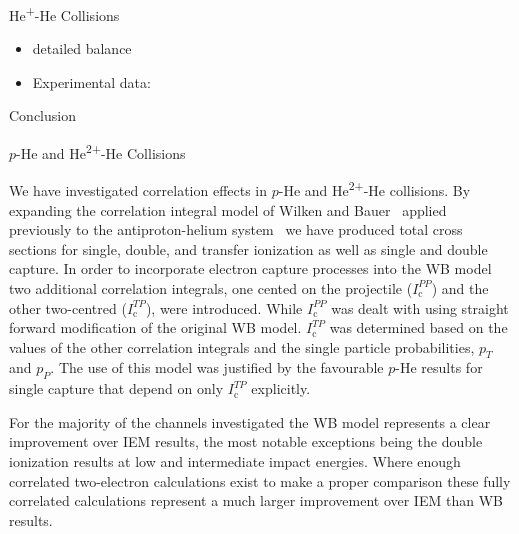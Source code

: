 \documentclass[letterpaper, 11 pt]{report}
\begin{document}
\begin{chapter}{\texorpdfstring{He\textsuperscript{+}}{He+}-He Collisions \label{chap:hep-he}}

   \begin{itemize}
      
      \item detailed balance~\cite[p. 143--152]{scattering}

      \item Experimental data:~\cite{DT-88, Dub-89, FTFHLP-95, SSMSM-11}

   \end{itemize}

\end{chapter}

\begin{chapter}{Conclusion \label{chap:con}}

   \begin{section}{\texorpdfstring{$p$}{p}-He and \texorpdfstring{He\textsuperscript{2+}}{He2+}-He
                   Collisions \label{sec:con-phe2p-he}}

      We have investigated correlation effects in $p$-He and He\textsuperscript{2+}-He collisions. By
      expanding the correlation integral model of Wilken and Bauer~\cite{wb} applied previously to the
      antiproton-helium system~\cite{pbarhe} we have produced total cross sections for single, double,
      and transfer ionization as well as single and double capture. In order to incorporate electron
      capture processes into the WB model two additional correlation integrals, one cented on the
      projectile ($I^{PP}_\mathrm{c}$) and the other two-centred ($I^{TP}_\mathrm{c}$), were
      introduced. While $I^{PP}_\mathrm{c}$ was dealt with using straight forward modification of the
      original WB model. $I^{TP}_\mathrm{c}$ was determined based on the values of the other correlation
      integrals and the single particle probabilities, $p_T$ and $p_P$. The use of this model was
      justified by the favourable $p$-He results for single capture that depend on only
      $I^{TP}_\mathrm{c}$ explicitly.

      For the majority of the channels investigated the WB model represents a clear improvement over IEM 
      results, the most notable exceptions being the double ionization results at low and intermediate
      impact energies. Where enough correlated two-electron calculations exist to make a proper
      comparison these fully correlated calculations represent a much larger improvement over IEM than
      WB results. 
  

\end{section}
\end{chapter}
\end{document}
